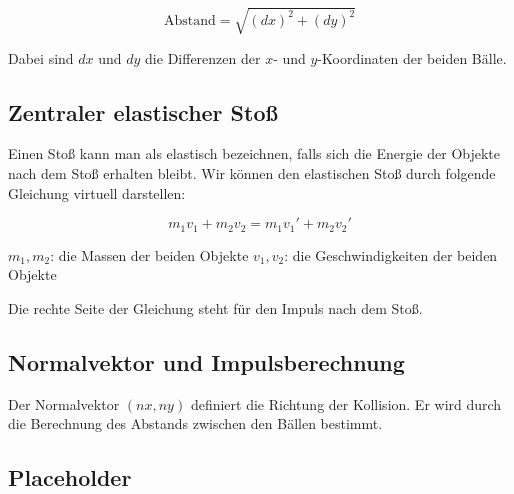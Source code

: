 \documentclass[11pt,a4paper]{article}
\begin{document}
\[
\text{Abstand} = \sqrt{(dx)^2 + (dy)^2}
\]

Dabei sind \(dx\) und \(dy\) die Differenzen der \(x\)- und \(y\)-Koordinaten der beiden Bälle.

\subsection{Zentraler elastischer Stoß}


Einen Stoß kann man als elastisch bezeichnen, falls sich die Energie der Objekte nach dem Stoß erhalten bleibt. Wir können den elastischen Stoß durch folgende Gleichung virtuell darstellen:

\[
m_1 v_1 + m_2 v_2 = m_1 v_1' + m_2 v_2'
\]

\begin{outline}
	\1 $m_1, m_2$: die Massen der beiden Objekte
	\1 $v_1, v_2$: die Geschwindigkeiten der beiden Objekte
\end{outline}

Die rechte Seite der Gleichung steht für den Impuls nach dem Stoß.



\subsection{Normalvektor und Impulsberechnung}
Der Normalvektor \((nx, ny)\) definiert die Richtung der Kollision. Er wird durch die Berechnung des Abstands zwischen den Bällen bestimmt.


\subsection{Placeholder}
\end{document}

